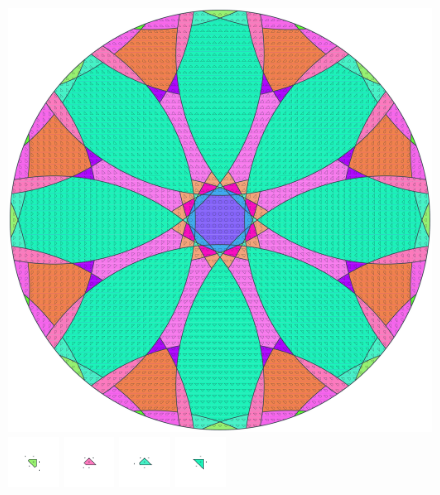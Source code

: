 \documentclass[text.tex]{subfiles}
\begin{document}
\clearpage
\pagestyle{fancy}
\fancyhf{}
\begin{figure}[h!]
\centering
\includegraphics[width=1\textwidth]{img/results/circle8/circle8_216067_(3109_-1286alpha_2).pdf}
\includegraphics[width=0.12\textwidth]{img/results/circle8/circle8_216067_(3109_-1286alpha_2)_001.pdf}
\includegraphics[width=0.12\textwidth]{img/results/circle8/circle8_216067_(3109_-1286alpha_2)_002.pdf}
\includegraphics[width=0.12\textwidth]{img/results/circle8/circle8_216067_(3109_-1286alpha_2)_003.pdf}
\includegraphics[width=0.12\textwidth]{img/results/circle8/circle8_216067_(3109_-1286alpha_2)_004.pdf}

\end{figure}
\end{document}
